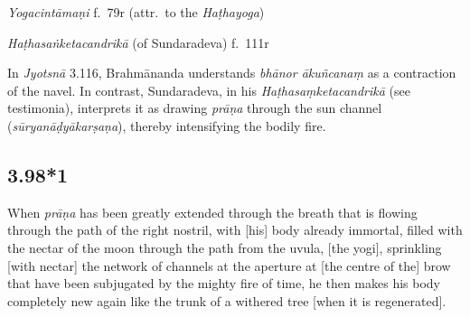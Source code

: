 \begin{ekdosis}
\begin{testimonia}[hp03_098]
\emph{Yogacintāmaṇi} f.~79r (attr.~to the \emph{Haṭhayoga})
\begin{versinnote}
\end{versinnote}

\emph{Haṭhasaṅketacandrikā} (of Sundaradeva) f.~111r
\begin{versinnote}
\end{versinnote}
\end{testimonia}

\begin{philcomm}[hp03_098]
In \emph{Jyotsnā} 3.116, Brahmānanda understands \emph{bhānor ākuñcanaṃ} as a contraction of the navel. In contrast, Sundaradeva, in his \emph{Haṭhasaṃketacandrikā} (see testimonia), interprets it as drawing \emph{prāṇa} through the sun channel (\emph{sūryanāḍyākarṣaṇa}), thereby intensifying the bodily fire.
\end{philcomm}


\subsection*{3.98*1}
\begin{translation}[hp03_098_1]
When \textit{prāṇa} has been greatly extended through the breath that is flowing through the path of the right nostril, with [his] body already immortal, filled with the nectar of the moon through the path from the uvula,
[the yogi], sprinkling [with nectar] the network of channels at the aperture at [the centre of the] brow that have been subjugated by the mighty fire of time, he then makes his body completely new again like the trunk of a withered tree [when it is regenerated].
\end{translation}


\end{ekdosis}
